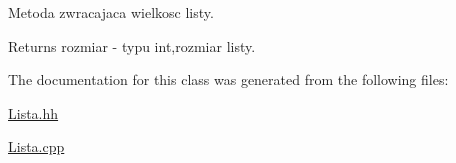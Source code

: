 Metoda zwracajaca wielkosc listy. 

\begin{DoxyReturn}{Returns}
rozmiar -\/ typu int,rozmiar listy. 
\end{DoxyReturn}


The documentation for this class was generated from the following files\+:\begin{DoxyCompactItemize}
\item 
\hyperlink{a00016}{Lista.\+hh}\item 
\hyperlink{a00015}{Lista.\+cpp}\end{DoxyCompactItemize}
